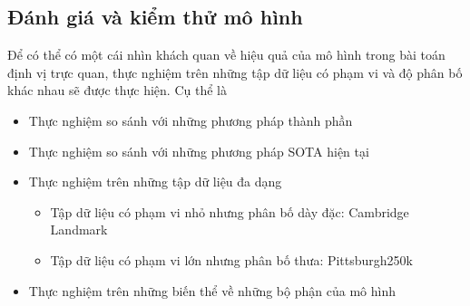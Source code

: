 \subsection{Đánh giá và kiểm thử mô hình}
Để có thể có một cái nhìn khách quan về hiệu quả của mô hình trong bài toán định vị trực quan, thực nghiệm trên những tập dữ liệu có phạm vi và độ phân bố khác nhau sẽ được thực hiện. Cụ thể là

\begin{itemize}
    \item Thực nghiệm so sánh với những phương pháp thành phần
    \item Thực nghiệm so sánh với những phương pháp SOTA hiện tại
    \item Thực nghiệm trên những tập dữ liệu đa dạng
          \begin{itemize}
              \item Tập dữ liệu có phạm vi nhỏ nhưng phân bố dày đặc: Cambridge Landmark
              \item Tập dữ liệu có phạm vi lớn nhưng phân bố thưa: Pittsburgh250k
          \end{itemize}
    \item Thực nghiệm trên những biến thể về những bộ phận của mô hình
\end{itemize}

